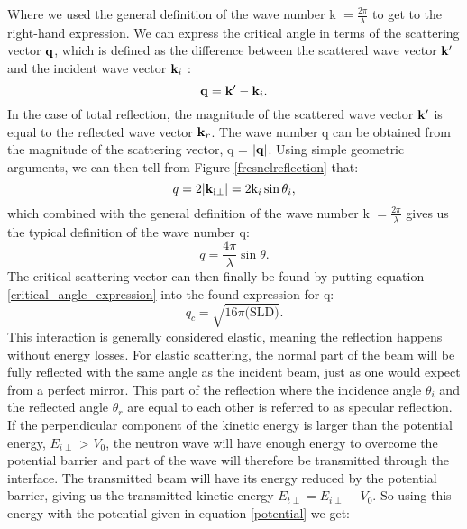 Where we used the general definition of the wave number k $= \frac{2\pi}{\lambda}$ to get to the right-hand expression. We can express the critical angle in terms of the scattering vector $\vb{q}$, which is defined as the difference between the scattered wave vector $\vb{k}^\prime$  and the incident wave vector  $\vb{k}_i$ \cite{kittel}:
\begin{equation}\label{qvector}
	\vb{q} =  \vb{k}^\prime - \vb{k}_i.
\end{equation}
In the case of total reflection, the magnitude of the scattered wave vector $\vb{k}^\prime$ is equal to the reflected wave vector  $\vb{k}_r$. The wave number q can be obtained from the magnitude of the scattering vector, q = $\abs{\vb{q}}$. Using simple geometric arguments, we can then tell from Figure \ref{fresnelreflection} that:
\begin{equation}\label{q_ktheta}
	q= 2 \abs{\vb{k_{i\perp}}} = 2\textrm{k}_{i} \sin\theta_i,
\end{equation}
which combined with the general definition of the wave number k $= \frac{2\pi}{\lambda}$ gives us the typical definition of the wave number q:
\begin{equation}\label{qvector}
	q= \frac{4\pi}{\lambda} \sin\theta. 
\end{equation}
The critical scattering vector can then finally be found by putting equation \ref{critical_angle_expression} into the found expression for q:
\begin{equation}
	q_c = \sqrt{16 \pi \textrm{(SLD)}} \label{criticalangle}.
\end{equation}
This interaction is generally considered elastic, meaning the reflection happens without energy losses. For elastic scattering, the normal part of the beam will be fully reflected with the same angle as the incident beam, just as one would expect from a perfect mirror. This part of the reflection where the incidence angle $\theta_i$ and the reflected angle $\theta_r$ are equal to each other is referred to as specular reflection.
If the perpendicular component of the kinetic energy is larger than the potential energy, $E_{i\perp}$ > $V_0$, the neutron wave will have enough energy to overcome the potential barrier and part of the wave will therefore be transmitted through the interface. The transmitted beam will have its energy reduced by the potential barrier, giving us the transmitted kinetic energy $E_{t\perp} = E_{i\perp} - V_0$. So using this energy with the potential given in equation \ref{potential} we get:

